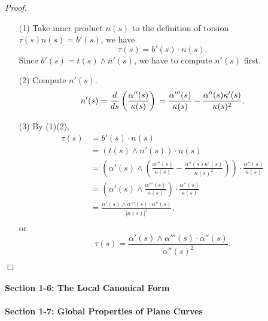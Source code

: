 \documentclass{article}
\begin{document}
\emph{Proof.}
\begin{enumerate}
\item[(1)]
Take inner product $n(s)$
to the definition of torsion $\tau(s) n(s) = b'(s)$,
we have $$\tau(s) = b'(s) \cdot n(s).$$
Since $b'(s) = t(s) \wedge n'(s)$, we have to compute $n'(s)$ first.
\item[(2)]
Compute $n'(s)$.
$$n'(s)
= \frac{d}{ds} \left( \frac{\alpha''(s)}{\kappa(s)} \right) \\
= \frac{\alpha'''(s)}{\kappa(s)} - \frac{\alpha''(s)\kappa'(s)}{\kappa(s)^2}.$$
\item[(3)]
By (1)(2),
\begin{align*}
\tau(s)
&= b'(s) \cdot n(s) \\
&= (t(s) \wedge n'(s)) \cdot n(s) \\
&= \left(
  \alpha'(s)
    \wedge
  \left(
    \frac{\alpha'''(s)}{\kappa(s)}
    - \frac{\alpha''(s)\kappa'(s)}{\kappa(s)^2}
  \right)
\right)
\cdot \frac{\alpha''(s)}{\kappa(s)} \\
&= \left(
  \alpha'(s) \wedge \frac{\alpha'''(s)}{\kappa(s)}
\right)
\cdot \frac{\alpha''(s)}{\kappa(s)} \\
&= \frac{\alpha'(s) \wedge \alpha'''(s) \cdot \alpha''(s)}{|\kappa(s)|^2}, \\
\end{align*}
or
$$\tau(s) = \frac{\alpha'(s) \wedge \alpha'''(s) \cdot \alpha''(s)}{\alpha''(s)^2}.$$

\end{enumerate}
$\Box$ \\\\






\textbf{\large Section 1-6: The Local Canonical Form} \\\\






\textbf{\large Section 1-7: Global Properties of Plane Curves} \\\\



\end{document}

